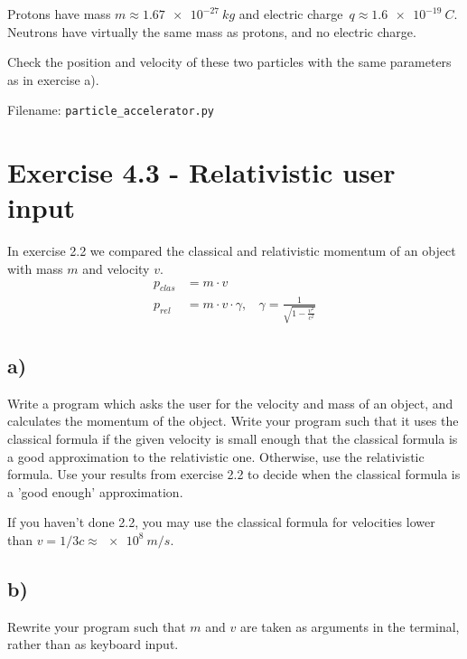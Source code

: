 \documentclass[10pt,a4paper]{article}
\begin{document}
Protons have mass $m \approx \SI{1.67e-27}{kg}$ and electric charge $q \approx \SI{1.6e-19}{C}$. Neutrons have virtually the same mass as protons, and no electric charge.

Check the position and velocity of these two particles with the same parameters as in exercise a).

Filename: \texttt{particle\_accelerator.py}


\section*{Exercise 4.3 - Relativistic user input}
In exercise 2.2 we compared the classical and relativistic momentum of an object with mass $m$ and velocity $v$.
\begin{align*}
p_{clas} &= m\cdot v
\\
p_{rel} &= m\cdot v\cdot \gamma, \ \ \ \ \gamma = \frac{1}{\sqrt{1-\frac{v^2}{c^2}}}
\end{align*}

\subsection*{a)}
Write a program which asks the user for the velocity and mass of an object, and calculates the momentum of the object. Write your program such that it uses the classical formula if the given velocity is small enough that the classical formula is a good approximation to the relativistic one. Otherwise, use the relativistic formula. Use your results from exercise 2.2 to decide when the classical formula is a 'good enough' approximation.

If you haven't done 2.2, you may use the classical formula for velocities lower than $v = 1/3c \approx \SI{e8}{m/s}$.

\subsection*{b)}
Rewrite your program such that $m$ and $v$ are taken as arguments in the terminal, rather than as keyboard input.
\end{document}
